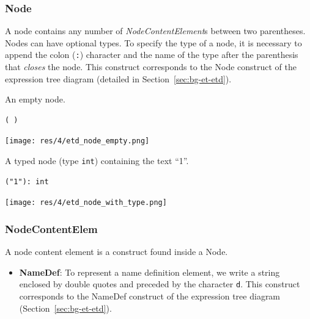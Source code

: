 \begin{chapterBody}
\subsubsection*{Node}

A node contains any number of \textit{NodeContentElement}s between two
parentheses. Nodes can have optional types. To specify the type of a node,
it is necessary to append the colon (\texttt{:}) character and the name of the 
type after the parenthesis that \textit{closes} the node.
This construct corresponds to the Node construct of the expression tree
diagram (detailed in Section~\ref{sec:bg-et-etd}).

\begin{minipage}{.3\linewidth}
An empty node.
\end{minipage}
\hspace{.02\linewidth}
\begin{minipage}{.3\linewidth}
\begin{lstlisting}[language=etl]
( )
\end{lstlisting} 
\end{minipage}
\hspace{.02\linewidth}
\begin{minipage}{.3\linewidth}
\texttt{[image: res/4/etd\_node\_empty.png]}
\end{minipage}

\begin{minipage}{.3\linewidth}
A typed node (type \texttt{int}) \hfill\break
containing the text ``1''.
\end{minipage}
\hspace{.02\linewidth}
\begin{minipage}{.3\linewidth}
\begin{lstlisting}[language=etl]
("1"): int
\end{lstlisting} 
\end{minipage}
\hspace{.02\linewidth}
\begin{minipage}{.3\linewidth}
\texttt{[image: res/4/etd\_node\_with\_type.png]}
\end{minipage}

\subsubsection*{NodeContentElem}

A node content element is a construct found inside a Node.

\begin{itemize}
    \item \textbf{NameDef}: To represent a name definition element, we write a
string enclosed by double quotes and preceded by the character \texttt{d}.
This construct corresponds to the NameDef construct of the expression tree
diagram (Section~\ref{sec:bg-et-etd}).


\end{itemize}
\end{chapterBody}
